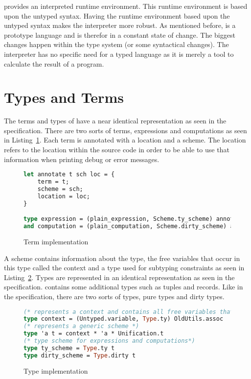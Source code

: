 \eff provides an interpreted runtime environment. This runtime environment is based upon the untyped syntax. Having the runtime environment based upon the untyped syntax makes the interpreter more robust. As mentioned before, \eff is a prototype language and is therefor in a constant state of change. The biggest changes happen within the type system (or some syntactical changes). The interpreter has no specific need for a typed language as it is merely a tool to calculate the result of a program.  

\section{Types and Terms}
The terms and types of \core have a near identical representation as seen in the specification. There are two sorts of terms, expressions and computations as seen in Listing~\ref{lst:expression}. Each term is annotated with a location and a scheme. The location refers to the location within the source code in order to be able to use that information when printing debug or error messages.

\begin{figure}
\caption{Term implementation}
\label{lst:expression}
\begin{lstlisting}[language=Caml]
let annotate t sch loc = {
    term = t;
    scheme = sch;
    location = loc;
}

type expression = (plain_expression, Scheme.ty_scheme) annotation
and computation = (plain_computation, Scheme.dirty_scheme) annotation  
\end{lstlisting}
\end{figure}

A scheme contains information about the type, the free variables that occur in this type called the context and a type used for subtyping constraints as seen in Listing~\ref{lst:scheme}. Types are represented in an identical representation as seen in the specification. \eff contains some additional types such as tuples and records. Like in the specification, there are two sorts of types, pure types and dirty types. 

\begin{figure}
\caption{Type implementation}
\label{lst:scheme}
\begin{lstlisting}[language=Caml]
(* represents a context and contains all free variables that occur *)
type context = (Untyped.variable, Type.ty) OldUtils.assoc
(* represents a generic scheme *)
type 'a t = context * 'a * Unification.t
(* type scheme for expressions and computations*)
type ty_scheme = Type.ty t
type dirty_scheme = Type.dirty t
\end{lstlisting}
\end{figure}

